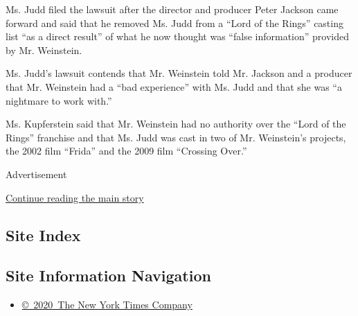 Ms. Judd filed the lawsuit after the director and producer Peter Jackson
came forward and said that he removed Ms. Judd from a ``Lord of the
Rings'' casting list ``as a direct result'' of what he now thought was
``false information'' provided by Mr. Weinstein.

Ms. Judd's lawsuit contends that Mr. Weinstein told Mr. Jackson and a
producer that Mr. Weinstein had a ``bad experience'' with Ms. Judd and
that she was ``a nightmare to work with.''

Ms. Kupferstein said that Mr. Weinstein had no authority over the ``Lord
of the Rings'' franchise and that Ms. Judd was cast in two of Mr.
Weinstein's projects, the 2002 film ``Frida'' and the 2009 film
``Crossing Over.''

Advertisement

\protect\hyperlink{after-bottom}{Continue reading the main story}

\hypertarget{site-index}{%
\subsection{Site Index}\label{site-index}}

\hypertarget{site-information-navigation}{%
\subsection{Site Information
Navigation}\label{site-information-navigation}}

\begin{itemize}
\tightlist
\item
  \href{https://help.nytimes3xbfgragh.onion/hc/en-us/articles/115014792127-Copyright-notice}{©~2020~The
  New York Times Company}
\end{itemize}

